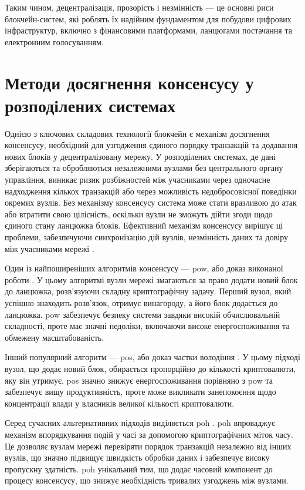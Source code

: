 \documentclass[14pt]{extreport}
\begin{document}
  Таким чином, децентралізація, прозорість і незмінність — це основні риси блокчейн-систем, які роблять їх надійним фундаментом для побудови цифрових інфраструктур, включно з фінансовими платформами, ланцюгами постачання та електронним голосуванням.

  \section{Методи досягнення консенсусу у розподілених системах}

  Однією з ключових складових технології блокчейн є механізм досягнення консенсусу, необхідний для узгодження єдиного порядку транзакцій та додавання нових блоків у децентралізовану мережу. У розподілених системах, де дані зберігаються та обробляються незалежними вузлами без центрального органу управління, виникає ризик розбіжностей між учасниками через одночасне надходження кількох транзакцій або через можливість недобросовісної поведінки окремих вузлів. Без механізму консенсусу система може стати вразливою до атак або втратити свою цілісність, оскільки вузли не зможуть дійти згоди щодо єдиного стану ланцюжка блоків. Ефективний механізм консенсусу вирішує ці проблеми, забезпечуючи синхронізацію дій вузлів, незмінність даних та довіру між учасниками мережі \cite{consensus}.

  Один із найпоширеніших алгоритмів консенсусу — \gls{pow}, або доказ виконаної роботи \cite{pow}. У цьому алгоритмі вузли мережі змагаються за право додати новий блок до ланцюжка, розв'язуючи складну криптографічну задачу. Перший вузол, який успішно знаходить розв'язок, отримує винагороду, а його блок додається до ланцюжка. \gls{pow} забезпечує безпеку системи завдяки високій обчислювальній складності, проте має значні недоліки, включаючи високе енергоспоживання та обмежену масштабованість.

  Інший популярний алгоритм — \gls{pos}, або доказ частки володіння \cite{pos}. У цьому підході вузол, що додає новий блок, обирається пропорційно до кількості криптовалюти, яку він утримує. \gls{pos} значно знижує енергоспоживання порівняно з \gls{pow} та забезпечує вищу продуктивність, проте може викликати занепокоєння щодо концентрації влади у власників великої кількості криптовалюти.

  Серед сучасних альтернативних підходів виділяється \gls{poh} \cite{poh}. \gls{poh} впроваджує механізм впорядкування подій у часі за допомогою криптографічних міток часу. Це дозволяє вузлам мережі перевіряти порядок транзакцій незалежно від інших вузлів, що значно підвищує швидкість обробки даних і забезпечує високу пропускну здатність. \gls{poh} унікальний тим, що додає часовий компонент до процесу консенсусу, що знижує необхідність тривалих узгоджень між вузлами.
\end{document}
